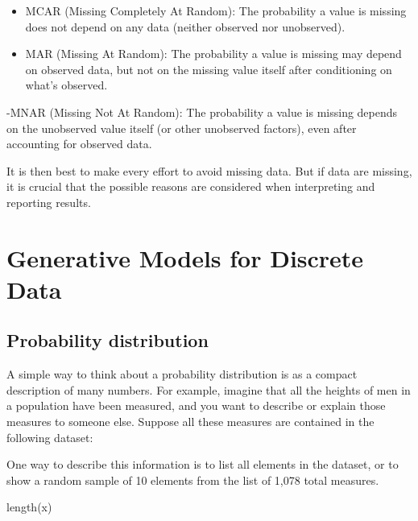 \documentclass[
  letterpaper,
  DIV=11,
  numbers=noendperiod]{scrreprt}
\newenvironment{Shaded}{\begin{snugshade}}{\end{snugshade}}
\newcommand{\AttributeTok}[1]{\textcolor[rgb]{0.40,0.45,0.13}{#1}}
\newcommand{\FunctionTok}[1]{\textcolor[rgb]{0.28,0.35,0.67}{#1}}
\newcommand{\NormalTok}[1]{\textcolor[rgb]{0.00,0.23,0.31}{#1}}
\newcommand{\OtherTok}[1]{\textcolor[rgb]{0.00,0.23,0.31}{#1}}
\newcommand{\SpecialCharTok}[1]{\textcolor[rgb]{0.37,0.37,0.37}{#1}}
\newcommand{\StringTok}[1]{\textcolor[rgb]{0.13,0.47,0.30}{#1}}
\begin{document}
\begin{itemize}
\item
  MCAR (Missing Completely At Random): The probability a value is
  missing does not depend on any data (neither observed nor unobserved).
\item
  MAR (Missing At Random): The probability a value is missing may depend
  on observed data, but not on the missing value itself after
  conditioning on what's observed.
\end{itemize}

-MNAR (Missing Not At Random): The probability a value is missing
depends on the unobserved value itself (or other unobserved factors),
even after accounting for observed data.

It is then best to make every effort to avoid missing data. But if data
are missing, it is crucial that the possible reasons are considered when
interpreting and reporting results.

\chapter{Generative Models for Discrete
Data}\label{generative-models-for-discrete-data}

\section{Probability distribution}\label{probability-distribution}

A simple way to think about a probability distribution is as a compact
description of many numbers. For example, imagine that all the heights
of men in a population have been measured, and you want to describe or
explain those measures to someone else. Suppose all these measures are
contained in the following dataset:

\begin{Shaded}
\end{Shaded}

One way to describe this information is to list all elements in the
dataset, or to show a random sample of 10 elements from the list of
1,078 total measures.

\begin{Shaded}
\begin{Highlighting}[]
\FunctionTok{length}\NormalTok{(x)}
\end{Highlighting}
\end{Shaded}
\end{document}
